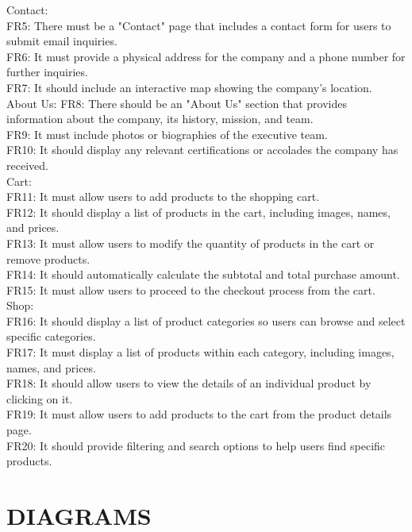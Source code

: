 \documentclass[journal]{IEEEtran}
\begin{document}
Contact: \\
FR5: There must be a "Contact" page that includes a contact form for users to submit email inquiries. \\
FR6: It must provide a physical address for the company and a phone number for further inquiries. \\
FR7: It should include an interactive map showing the company's location. \\

About Us: 
FR8: There should be an "About Us" section that provides information about the company, its history, mission, and team. \\
FR9: It must include photos or biographies of the executive team. \\
FR10: It should display any relevant certifications or accolades the company has received. \\

Cart: \\
FR11: It must allow users to add products to the shopping cart. \\
FR12: It should display a list of products in the cart, including images, names, and prices. \\
FR13: It must allow users to modify the quantity of products in the cart or remove products. \\
FR14: It should automatically calculate the subtotal and total purchase amount. FR15: It must allow users to proceed to the checkout process from the cart. \\

Shop: \\
FR16: It should display a list of product categories so users can browse and select specific categories. \\
FR17: It must display a list of products within each category, including images, names, and prices. \\
FR18: It should allow users to view the details of an individual product by clicking on it. \\
FR19: It must allow users to add products to the cart from the product details page. \\
FR20: It should provide filtering and search options to help users find specific products.\\

\newpage

\section{DIAGRAMS}
\end{document}
